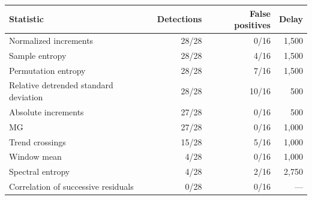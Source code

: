 \begin{tabularx}{\linewidth}{@{}>{\raggedright\arraybackslash}Xrrr@{}}
\toprule
Statistic & Detections & False positives & Delay \\
\midrule
Normalized increments & 28/28 & 0/16 & 1,500 \\
Sample entropy & 28/28 & 4/16 & 1,500 \\
Permutation entropy & 28/28 & 7/16 & 1,500 \\
Relative detrended standard deviation & 28/28 & 10/16 & 500 \\
Absolute increments & 27/28 & 0/16 & 500 \\
MG & 27/28 & 0/16 & 1,000 \\
Trend crossings & 15/28 & 5/16 & 1,000 \\
Window mean & 4/28 & 0/16 & 1,000 \\
Spectral entropy & 4/28 & 2/16 & 2,750 \\
Correlation of successive residuals & 0/28 & 0/16 & --- \\
\bottomrule
\end{tabularx}
